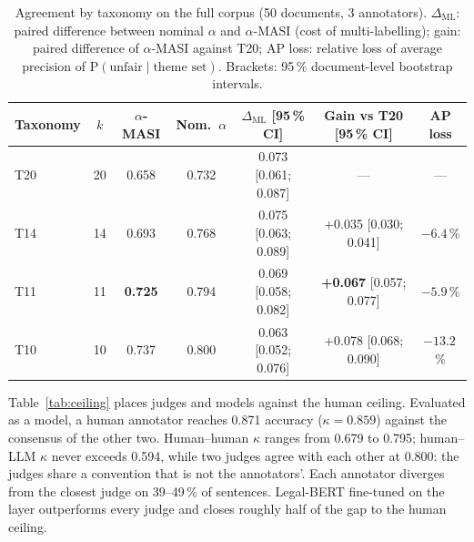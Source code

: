 \documentclass{IOS-Book-Article}
\begin{document}
\begin{table}[t]
\caption{Agreement by taxonomy on the full corpus (50 documents, 3 annotators). $\Delta_{\mathrm{ML}}$: paired difference between nominal $\alpha$ and $\alpha$-MASI (cost of multi-labelling); gain: paired difference of $\alpha$-MASI against T20; AP loss: relative loss of average precision of $\mathrm{P}(\text{unfair}\mid\text{theme set})$. Brackets: 95\,\% document-level bootstrap intervals.}
\label{tab:agreement}
\centering
\footnotesize\setlength{\tabcolsep}{4pt}%
\begin{tabular}{lcccccc}
\toprule
Taxonomy & $k$ & $\alpha$-MASI & Nom.\ $\alpha$ & $\Delta_{\mathrm{ML}}$ [95\,\% CI] & Gain vs T20 [95\,\% CI] & AP loss \\
\midrule
T20 & 20 & 0.658 & 0.732 & 0.073 [0.061; 0.087] & --- & --- \\
T14 & 14 & 0.693 & 0.768 & 0.075 [0.063; 0.089] & +0.035 [0.030; 0.041] & $-6.4$\,\% \\
T11 & 11 & \textbf{0.725} & 0.794 & 0.069 [0.058; 0.082] & \textbf{+0.067} [0.057; 0.077] & $-5.9$\,\% \\
T10 & 10 & 0.737 & 0.800 & 0.063 [0.052; 0.076] & +0.078 [0.068; 0.090] & $-13.2$\,\% \\
\bottomrule
\end{tabular}
\end{table}

Table~\ref{tab:ceiling} places judges and models against the human ceiling. Evaluated as a model, a human annotator reaches 0.871 accuracy ($\kappa = 0.859$) against the consensus of the other two. Human--human $\kappa$ ranges from 0.679 to 0.795; human--LLM $\kappa$ never exceeds 0.594, while two judges agree with each other at 0.800: the judges share a convention that is not the annotators'. Each annotator diverges from the closest judge on 39--49\,\% of sentences. Legal-BERT fine-tuned on the layer outperforms every judge and closes roughly half of the gap to the human ceiling.
\end{document}
